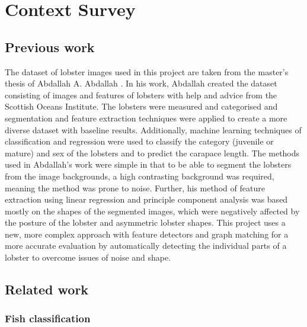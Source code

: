 \section{Context Survey}
\renewcommand{\imgpath}{tex/litreview/imgs}

\subsection{Previous work}
The dataset of lobster images used in this project are taken from the master's thesis of Abdallah A. Abdallah \cite{lobster-thesis}. In his work, Abdallah created the dataset consisting of images and features of lobsters with help and advice from the Scottish Oceans Institute. The lobsters were measured and categorised and segmentation and feature extraction techniques were applied to create a more diverse dataset with baseline results. Additionally, machine learning techniques of classification and regression were used to classify the category (juvenile or mature) and sex of the lobsters and to predict the carapace length. 
\n
The methods used in Abdallah's work were simple in that to be able to segment the lobsters from the image backgrounds, a high contrasting background was required, meaning the method was prone to noise. Further, his method of feature extraction using linear regression and principle component analysis was based mostly on the shapes of the segmented images, which were negatively affected by the posture of the lobster and asymmetric lobster shapes. This project uses a new, more complex approach with feature detectors and graph matching for a more accurate evaluation by automatically detecting the individual parts of a lobster to overcome issues of noise and shape. 

\subsection{Related work}

\subsubsection{Fish classification}

